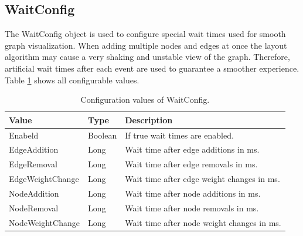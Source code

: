 \subsection{WaitConfig}
\label{ss:waitConfig}
The WaitConfig object is used to configure special wait times used for smooth graph visualization. When adding multiple nodes and edges at once the layout algorithm may cause a very shaking and unstable view of the graph. Therefore, artificial wait times after each event are used to guarantee a smoother experience. Table \ref{tab:waitConfigValues} shows all configurable values.

\begin{table}[h]
\caption{Configuration values of WaitConfig.}
\centering
\begin{tabular}[h]{|l|l|l|}\hline
	\textbf{Value} & \textbf{Type} & \textbf{Description}\\
	\hline
	Enabeld & Boolean & If true wait times are enabled.\\
	\hline
	EdgeAddition & Long & Wait time after edge additions in ms.\\
	\hline
	EdgeRemoval & Long & Wait time after edge removals in ms.\\
	\hline
	EdgeWeightChange & Long & Wait time after edge weight changes in ms.\\
	\hline
	NodeAddition & Long & Wait time after node additions in ms.\\
	\hline
	NodeRemoval & Long & Wait time after node removals in ms.\\
	\hline
	NodeWeightChange & Long & Wait time after node weight changes in ms.\\
	\hline
\end{tabular}
\label{tab:waitConfigValues}
\end{table}


